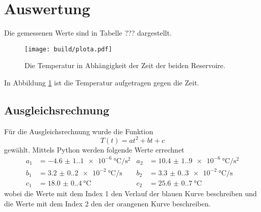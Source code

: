 \section{Auswertung}
\label{sec:Auswertung}
    Die gemessenen Werte sind in Tabelle ??? dargestellt.
    \begin{figure}
        \centering
        \texttt{[image: build/plota.pdf]}
        \caption{Die Temperatur in Abhängigkeit der Zeit der beiden Reservoire.}
        \label{abb:Fit_Temperatur}
    \end{figure}
    In Abbildung \ref{abb:Fit_Temperatur} ist die Temperatur aufgetragen gegen die Zeit.
    \subsection{Ausgleichsrechnung}
    Für die Ausgleichsrechnung wurde die Funktion
    \begin{equation}
        T(t) = at^2+bt+c
        \label{eq:Ausgleich}
    \end{equation}
    gewählt.
    Mittels Python werden folgende Werte errechnet
    \begin{align*}
        a_1 &= \SI{-4.6(1.1)e-6}{\degreeCelsius\per\square\second}
        & a_2 &= \SI{10.4(1.9)e-6}{\degreeCelsius\per\square\second}\\
        b_1 &= \SI{3.2(0.2)e-2}{\degreeCelsius\per\second}
        & b_2 &=\SI{3.3(0.3)e-2}{\degreeCelsius\per\second}\\
        c_1 &=\SI{18.0(0.4)}{\degreeCelsius}
        & c_2 &=\SI{25.6(0.7)}{\degreeCelsius}
    \end{align*}
    wobei die Werte mit dem Index 1 den Verlauf der blauen Kurve beschreiben
    und die Werte mit dem Index 2 den der orangenen Kurve beschreiben.

